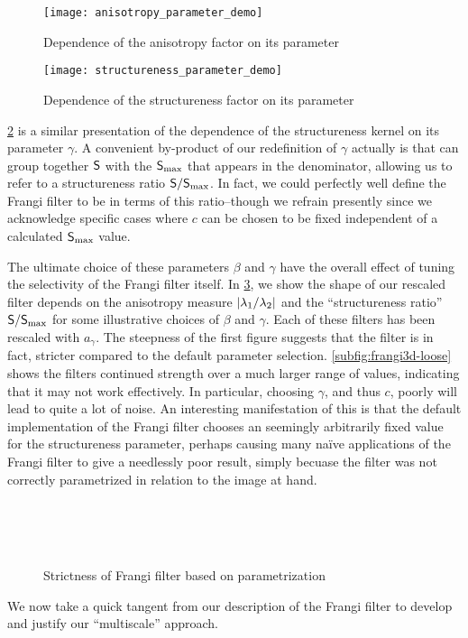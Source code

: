 \begin{figure}[t] \centering
  \texttt{[image: anisotropy\_parameter\_demo]}
  \caption{Dependence of the anisotropy factor on its parameter}
  \label{fig:anisotropy-parameter-demo}
\end{figure}

\begin{figure}[t] \centering
  \texttt{[image: structureness\_parameter\_demo]}\\[12pt]
  \caption{Dependence of the structureness factor on its parameter}
  \label{fig:structureness-parameter-demo}
\end{figure}

\cref{fig:structureness-parameter-demo} is a similar presentation of the dependence of the structureness kernel on its parameter $\gamma$.
A convenient by-product of our redefinition of $\gamma$ actually is that can group together $\mathsf{S}$ with the $\mathsf{S}_{\max}$ that appears in the denominator, allowing us to refer to a structureness ratio $\mathsf{S}/\mathsf{S}_{\max}$. In fact, we could perfectly well define the Frangi filter to be in terms of this ratio--though we refrain presently since we acknowledge specific cases where $c$ can be chosen to be fixed independent of a calculated $\mathsf{S}_{\max}$ value.


The ultimate choice of these parameters $\beta$ and $\gamma$ have the overall effect of tuning the selectivity of the Frangi filter itself. In \cref{fig:frangi3d-selection}, we show the shape of our rescaled filter depends on the anisotropy measure $\vert\lambda_1 / \lambda_2\vert$ and the ``structureness ratio'' $\mathsf{S}/\mathsf{S}_{\max}$ for some illustrative choices of $\beta$ and $\gamma$. Each of these filters has been rescaled with $a_\gamma$. The steepness of the first figure suggests that the filter is in fact, stricter compared to the default parameter selection. \cref{subfig:frangi3d-loose} shows the filters continued strength over a much larger range of values, indicating that it may not work effectively. In particular, choosing $\gamma$, and thus $c$, poorly will lead to quite a lot of noise.
An interesting manifestation of this is that the default implementation of the Frangi filter \autocite{scipy} chooses an seemingly arbitrarily fixed value for the structureness parameter, perhaps causing many na\"ive applications of the Frangi filter to give a needlessly poor result, simply becuase the filter was not correctly parametrized in relation to the image at hand.

\begin{figure}[t] \centering
\subfloat[Strict]{\texttt{[image: 4-rs]}} \label{subfig:frangi3d-strict} \\[-.2em]
\subfloat[Standard]{\texttt{[image: 14-rs]}} \label{subfig:frangi3d-default} \\[-.2em]
 \label{subfig:frangi3d-loose} \\[12pt]
\caption{Strictness of Frangi filter based on parametrization}
\label{fig:frangi3d-selection}
\end{figure}

	We now take a quick tangent from our description of the Frangi filter to develop and justify our ``multiscale'' approach.
	
